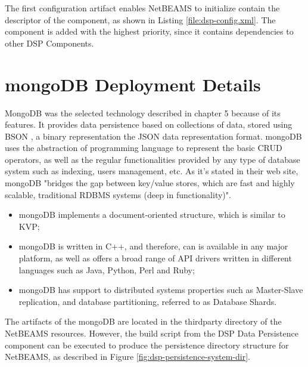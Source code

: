The first configuration artifact enables NetBEAMS to initialize contain the
descriptor of the component, as shown in Listing \ref{file:dsp-config.xml}.
The component is added with the highest priority, since it contains
dependencies to other DSP Components. 

\section{mongoDB Deployment Details}
\label{sec:mongodb-deployment}

MongoDB was the selected technology described in chapter 5 because of its
features. It provides data persistence based on collections of data, stored
using BSON \cite{bson}, a binary representation the JSON data representation
format. mongoDB uses the abstraction of programming language to
represent the basic CRUD operators, as well as the regular functionalities
provided by any type of database system such as indexing, users management,
etc. As it's stated in their web site, mongoDB "bridges the gap between
key/value stores, which are fast and highly scalable, traditional RDBMS
systems (deep in functionality)".

\begin{itemize}
  \item mongoDB implements a document-oriented structure, which is similar to
  KVP;
  \item mongoDB is written in C++, and therefore, can is available in any major
  platform, as well as offers a broad range of API drivers written in
  different languages such as Java, Python, Perl and Ruby;
  \item mongoDB has support to distributed systems properties such as
  Master-Slave replication, and database partitioning, referred to as Database
  Shards.
\end{itemize}

The artifacts of the mongoDB are located in the thirdparty directory of the
NetBEAMS resources. However, the build script from the DSP Data Persistence
component can be executed to produce the persistence directory structure for
NetBEAMS, as described in Figure \ref{fig:dsp-persistence-system-dir}.

